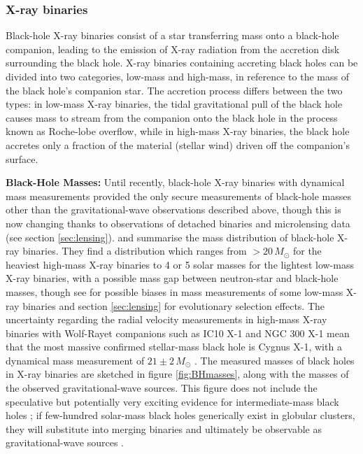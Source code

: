 \documentclass[review]{elsarticle}
\begin{document}
\subsubsection{X-ray binaries}\label{sec:XRB}

Black-hole X-ray binaries consist of a star transferring mass onto a black-hole companion, leading to the emission of X-ray radiation from the accretion disk surrounding the black hole.  X-ray binaries containing accreting black holes can be divided into two categories, low-mass and high-mass, in reference to the mass of the black hole's companion star. The accretion process differs between the two types: in low-mass X-ray binaries, the tidal gravitational pull of the black hole causes mass to stream from the companion onto the black hole in the process known as Roche-lobe overflow, while in high-mass X-ray binaries, the black hole accretes only a fraction of the material (stellar wind) driven off the companion's surface.

\textbf{Black-Hole Masses:} 
Until recently, black-hole X-ray binaries with dynamical mass measurements provided the only secure measurements of black-hole masses other than the gravitational-wave observations described above, though this is now changing thanks to observations of detached binaries and microlensing data (see section \ref{sec:lensing}).  \citet{Ozel:2010} and \citet{Farr:2011} summarise the mass distribution of black-hole X-ray binaries.  They find a distribution which ranges from $> 20\, M_\odot$ for the heaviest high-mass X-ray binaries to 4 or 5 solar masses for the lightest low-mass X-ray binaries, with a possible mass gap between neutron-star and black-hole masses, though see \cite{Kreidberg:2012} for possible biases in mass measurements of some low-mass X-ray binaries and section \ref{sec:lensing} for evolutionary selection effects.  The uncertainty regarding the radial velocity measurements in high-mass X-ray binaries with Wolf-Rayet companions such as IC10 X-1 and NGC 300 X-1 \citep{Laycock:2015} mean that the most massive confirmed stellar-mass black hole is Cygnus X-1, with a dynamical mass measurement of $21 \pm 2\, M_\odot$ \citep{MillerJones:2021}.   The measured masses of black holes in X-ray binaries are sketched in figure \ref{fig:BHmasses}, along with the masses of the observed gravitational-wave sources.  This figure does not include the speculative but potentially very exciting evidence for intermediate-mass black holes \citep{MillerColbert:2004,Greene:2019,Paynter:2021}; if few-hundred solar-mass black holes generically exist in globular clusters, they will substitute into merging binaries and ultimately be observable as gravitational-wave sources \citep[e.g.,][]{Mandel:2008,IMBBH:O1}.
\end{document}
